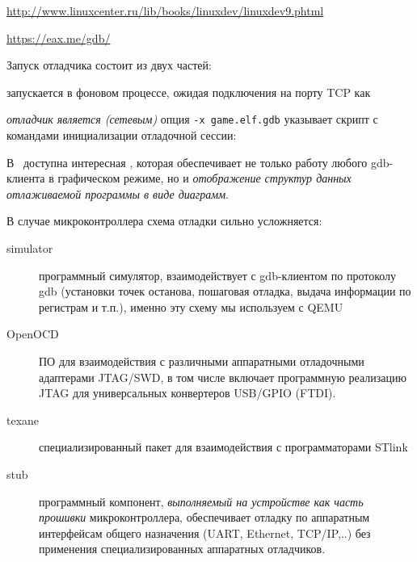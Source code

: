 \url{http://www.linuxcenter.ru/lib/books/linuxdev/linuxdev9.phtml}

\url{https://eax.me/gdb/}

\medskip\noindent
Запуск отладчика состоит из двух частей:
\begin{description}[nosep]
\item[qemu] запускается в фоновом процессе, ожидая подключения на порту TCP
 как 
\item[gdb] \emph{отладчик является (сетевым) }
опция \verb|-x game.elf.gdb| указывает скрипт с командами инициализации
отладочной сессии:
\end{description}

\clearpage
{}

В \linux\ доступна интересная  , которая
обеспечивает не только работу любого gdb-клиента в графическом режиме, но и
\emph{отображение структур данных отлаживаемой программы в виде диаграмм}.


\clearpage
{}
\clearpage
{}
\clearpage
{}

\clearpage
{}

В случае микроконтроллера схема отладки сильно усложняется:
\bigskip

\clearpage

\begin{description}
\item[simulator] программный симулятор, взаимодействует с gdb-клиентом по
протоколу gdb (установки точек останова, пошаговая отладка, выдача информации
по регистрам и т.п.), именно эту схему мы используем с QEMU
\item[OpenOCD] ПО для взаимодействия с различными аппаратными
отладочными адаптерами JTAG/SWD, в том числе включает программную реализацию
JTAG для универсальных конвертеров USB/GPIO (FTDI).
\item[texane] специализированный пакет для взаимодействия с программаторами
STlink
\item[stub] программный компонент, \emph{выполняемый на устройстве как часть
прошивки} микроконтроллера, обеспечивает отладку по аппаратным интерфейсам
общего назначения (UART, Ethernet, TCP/IP,..) без применения специализированных
аппаратных отладчиков.
\end{description}

